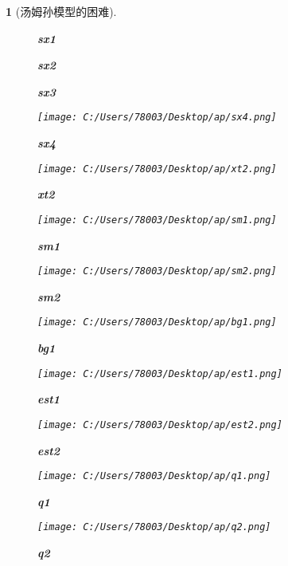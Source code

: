 \documentclass[UTF8]{report}
\theoremstyle{MyLineTheoremStyle} %
\theoremstyle{MyBlockTheoremStyle} %
\theoremstyle{MySubsubsectionStyle} %
\newtheorem{definition}{}
\begin{document}
\begin{definition}[汤姆孙模型的困难]
\begin{figure}[ht]
        \caption{\textbf{sx1}}
        \label{fig:sx1}
    \end{figure}
    \begin{figure}[ht]
        \centering
        \caption{\textbf{sx2}}
        \label{fig:sx2}
    \end{figure}
    \begin{figure}[ht]
        \centering
        \caption{\textbf{sx3}}
        \label{fig:sx3}
    \end{figure}
    \begin{figure}[ht]
        \centering
        \texttt{[image: C:/Users/78003/Desktop/ap/sx4.png]}
        \caption{\textbf{sx4}}
        \label{fig:sx4}
    \end{figure}
    \begin{figure}[ht]
        \centering
        \texttt{[image: C:/Users/78003/Desktop/ap/xt2.png]}
        \caption{\textbf{xt2}}
        \label{fig:xt2}
    \end{figure}
    \begin{figure}[ht]
        \centering
        \texttt{[image: C:/Users/78003/Desktop/ap/sm1.png]}
        \caption{\textbf{sm1}}
        \label{fig:sm1}
    \end{figure}
    \begin{figure}[ht]
        \centering
        \texttt{[image: C:/Users/78003/Desktop/ap/sm2.png]}
        \caption{\textbf{sm2}}
        \label{fig:sm2}
    \end{figure}
    \begin{figure}[ht]
        \centering
        \texttt{[image: C:/Users/78003/Desktop/ap/bg1.png]}
        \caption{\textbf{bg1}}
        \label{fig:bg1}
    \end{figure}
    \begin{figure}[ht]
        \centering
        \texttt{[image: C:/Users/78003/Desktop/ap/est1.png]}
        \caption{\textbf{est1}}
        \label{fig:est1}
    \end{figure}
    \begin{figure}[ht]
        \centering
        \texttt{[image: C:/Users/78003/Desktop/ap/est2.png]}
        \caption{\textbf{est2}}
        \label{fig:est2}
    \end{figure}
    \begin{figure}[ht]
        \centering
        \texttt{[image: C:/Users/78003/Desktop/ap/q1.png]}
        \caption{\textbf{q1}}
        \label{fig:q1}
    \end{figure}
    \begin{figure}[ht]
        \centering
        \texttt{[image: C:/Users/78003/Desktop/ap/q2.png]}
        \caption{\textbf{q2}}
        \label{fig:q2}
    \end{figure}
\end{definition}
\end{document}
